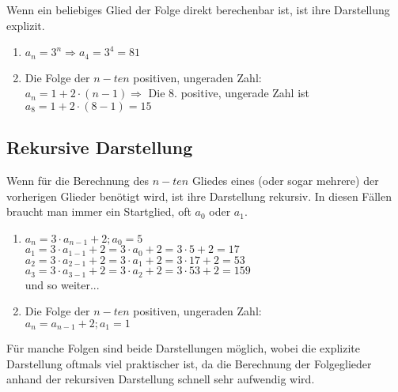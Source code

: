 \begin{Definition}
Wenn ein beliebiges Glied der Folge direkt berechenbar ist, ist ihre Darstellung explizit.
\end{Definition}

\begin{Beispiel}
\begin{enumerate}
\item  $a_{n}=3^n \Rightarrow a_{4}=3^4=81$
\item Die Folge der $n-ten$ positiven, ungeraden Zahl:\\
$a_{n}=1+2\cdot(n-1) \Rightarrow$ Die 8. positive, ungerade Zahl ist $ a_{8}=1+2\cdot(8-1)=15$
\end{enumerate}
\end{Beispiel}


	\subsection{Rekursive Darstellung}

\begin{Definition}
Wenn für die Berechnung des $n-ten$ Gliedes eines (oder sogar mehrere) der vorherigen Glieder benötigt wird, ist ihre Darstellung rekursiv.
In diesen Fällen braucht man immer ein Startglied, oft $a_{0}$ oder $ a_{1}$.
\end{Definition}

\begin{Beispiel}
\begin{enumerate}
\item  $a_{n}=3\cdot a_{n-1}+2;a_{0}=5$\\
\indent$a_{1}=3\cdot a_{1-1}+2=3\cdot a_{0}+2=3\cdot5+2=17$\\
\indent$a_{2}=3\cdot a_{2-1}+2=3\cdot a_{1}+2=3\cdot17+2=53$\\
\indent$a_{3}=3\cdot a_{3-1}+2=3\cdot a_{2}+2=3\cdot53+2=159$\\
\indent und so weiter...
\item Die Folge der $n-ten$ positiven, ungeraden Zahl:\\
$a_{n}=a_{n-1}+2;a_{1}=1$
\end{enumerate}
\end{Beispiel}

\begin{Bemerkung}
Für manche Folgen sind beide Darstellungen möglich, wobei die explizite Darstellung oftmals viel praktischer ist, da die Berechnung der Folgeglieder anhand der rekursiven Darstellung schnell sehr aufwendig wird.
\end{Bemerkung}

